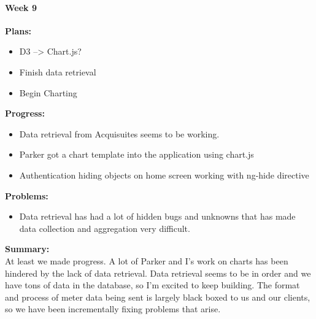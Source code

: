 \paragraph{Week 9}
\begin{adjustwidth}{2.5em}{0pt}
    \vspace{-0.5cm}\textbf{Plans:}
    \vspace{-0.5cm}
    \begin{itemize}
        \item D3 --> Chart.js?
        \item Finish data retrieval
        \item Begin Charting
    \end{itemize} 
    \vspace{-0.3cm}\textbf{Progress:}
    \vspace{-0.5cm}
    \begin{itemize}
        \item Data retrieval from Acquisuites seems to be working.
        \item Parker got a chart template into the application using chart.js
        \item Authentication hiding objects on home screen working with ng-hide directive
    \end{itemize} 
    \vspace{-0.3cm}\textbf{Problems:}
    \vspace{-0.5cm}
    \begin{itemize}
        \item Data retrieval has had a lot of hidden bugs and unknowns that has made data collection and aggregation very difficult.
    \end{itemize}  
    \vspace{-0.3cm}\noindent\textbf{Summary:}\\
    \noindent At least we made progress. A lot of Parker and I's work on charts has been hindered by the lack of data retrieval. Data retrieval seems to be in order and we have tons of data in the database, so I'm excited to keep building. The format and process of meter data being sent is largely black boxed to us and our clients, so we have been incrementally fixing problems that arise.
\end{adjustwidth} 
